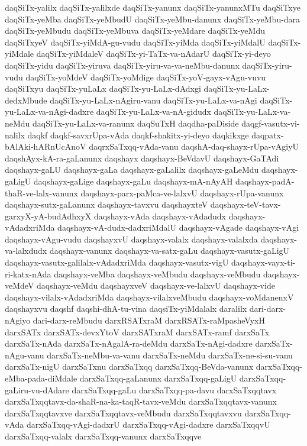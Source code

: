 {daqSiTx-yalilx
daqSiTx-yalilxde
daqSiTx-yanunx
daqSiTx-yanunxMTu
daqSiTxye
daqSiTx-yeMba
daqSiTx-yeMbudU
daqSiTx-yeMbu-danunx
daqSiTx-yeMbu-dara
daqSiTx-yeMbudu
daqSiTx-yeMbuva
daqSiTx-yeMdare
daqSiTx-yeMdu
daqSiTxyeV
daqSiTx-yiMdA-gu-vudu
daqSiTx-yiMda
daqSiTx-yiMdalU
daqSiTx-yiMdale
daqSiTx-yiMdaleV
daqSiTx-yi-TaTx-va-nAdarU
daqSiTx-yi-deyo
daqSiTx-yidu
daqSiTx-yiruva
daqSiTx-yiru-va-va-neMbu-danunx
daqSiTx-yiru-vudu
daqSiTx-yoMdeV
daqSiTx-yoMdige
daqSiTx-yoV-gayx-vAgu-vuvu
daqSiTxyu
daqSiTx-yuLaLx
daqSiTx-yu-LaLx-dAdxgi
daqSiTx-yu-LaLx-dedxMbude
daqSiTx-yu-LaLx-nAgiru-vanu
daqSiTx-yu-LaLx-va-nAgi
daqSiTx-yu-LaLx-va-nAgi-dadxre
daqSiTx-yu-LaLx-va-nA-gidudx
daqSiTx-yu-LaLx-va-neMdu
daqSiTx-yu-LaLx-va-ranunx
daqSuTxH
daqdha-paDiside
daqgf-vasutx-vi-nalilx
daqkf
daqkf-savxrUpa-vAda
daqkf-shakitx-yi-deyo
daqkikxge
daqpatx-bAlAki-hARnUcAnoV
daqrxSaTxqq-vAda-vanu
daqshA-daq-shayx-rUpa-vAgiyU
daqshAyx-kA-ra-gaLanunx
daqshayx
daqshayx-BeVdavU
daqshayx-GaTAdi
daqshayx-gaLU
daqshayx-gaLa
daqshayx-gaLalilx
daqshayx-gaLeMdu
daqshayx-gaLigU
daqshayx-gaLige
daqshayx-gaLu
daqshayx-mA-nAyAH
daqshayx-padA-thaR-ve-lalx-vanunx
daqshayx-parx-paMca-ve-lalxvU
daqshayx-rUpa-vanunx
daqshayx-sutx-gaLanunx
daqshayx-tavxvu
daqshayxteV
daqshayx-teV-tavx-garxyX-yA-budAdhxyX
daqshayx-vAda
daqshayx-vAdadudx
daqshayx-vAdadxriMda
daqshayx-vA-dudx-dadxriMdalU
daqshayx-vAgade
daqshayx-vAgi
daqshayx-vAgu-vudu
daqshayxvU
daqshayx-valalx
daqshayx-valalxda
daqshayx-va-lalxdudx
daqshayx-vanunx
daqshayx-va-satx-gaLu
daqshayx-vasutx-gaLigU
daqshayx-vasutx-galilalx-vAdadxriMda
daqshayx-vasutx-vigU
daqshayx-vayx-ti-ri-katx-nAda
daqshayx-veMba
daqshayx-veMbudu
daqshayx-veMbudu
daqshayx-veMdeV
daqshayx-veMdu
daqshayxveV
daqshayx-ve-lalxvU
daqshayx-vide
daqshayx-vilalx-vAdadxriMda
daqshayx-vilalxveMbudu
daqshayx-voMdanenxV
daqshayxvu
daqshf
daqshi-dhA-tu-vina
daqsiTx-yiMdalalx
daralilx
dari-darx-nAgiyo
dari-darx-reMbudu
darxRSATxraM
darxRSATx-raMpasheVyxH
darxSATx
darxSATx-devxYtoV
darxSATxraM
darxSATx-ramf
darxSaTx
darxSaTx-nAda
darxSaTx-nAgalA-ra-deMdu
darxSaTx-nAgi-dadxre
darxSaTx-nAgu-vanu
darxSaTx-neMbu-va-vanu
darxSaTx-neMdu
darxSaTx-ne-si-su-vanu
darxSaTx-nigU
darxSaTxnu
darxSaTxqq
darxSaTxqq-BeVda-vanunx
darxSaTxqq-eMba-pada-diMdale
darxSaTxqq-gaLanunx
darxSaTxqq-gaLigU
darxSaTxqq-gaLiru-vu-dAdare
darxSaTxqq-gaLu
darxSaTxqq-pa-davu
darxSaTxqqtavx
darxSaTxqqtavx-da-shaR-na-ka-taqR-tavx-veMdu
darxSaTxqqtavx-vanunx
darxSaTxqqtavxve
darxSaTxqqtavx-veMbudu
darxSaTxqqtavxvu
darxSaTxqq-vAda
darxSaTxqq-vAgi-dadxrU
darxSaTxqq-vAgi-dadxre
darxSaTxqqvU
darxSaTxqq-valalx
darxSaTxqq-vanunx
darxSaTxqqve
}
